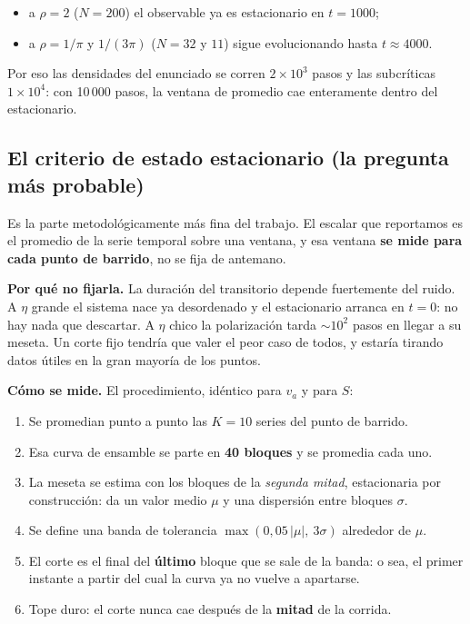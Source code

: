 \documentclass[11pt]{article}
\begin{document}
\begin{itemize}
  \item a $\rho = 2$ ($N = 200$) el observable ya es estacionario en $t = 1000$;
  \item a $\rho = 1/\pi$ y $1/(3\pi)$ ($N = 32$ y $11$) sigue evolucionando
    hasta $t \approx 4000$.
\end{itemize}

Por eso las densidades del enunciado se corren $2\times10^3$ pasos y las
subcríticas $1\times10^4$: con 10\,000 pasos, la ventana de promedio cae
enteramente dentro del estacionario.

\subsection{El criterio de estado estacionario (la pregunta más probable)}

Es la parte metodológicamente más fina del trabajo. El escalar que reportamos es
el promedio de la serie temporal sobre una ventana, y esa ventana \textbf{se
mide para cada punto de barrido}, no se fija de antemano.

\textbf{Por qué no fijarla.} La duración del transitorio depende fuertemente del
ruido. A $\eta$ grande el sistema nace ya desordenado y el estacionario arranca
en $t = 0$: no hay nada que descartar. A $\eta$ chico la polarización tarda
$\sim 10^2$ pasos en llegar a su meseta. Un corte fijo tendría que valer el peor
caso de todos, y estaría tirando datos útiles en la gran mayoría de los puntos.

\textbf{Cómo se mide.} El procedimiento, idéntico para $v_a$ y para $S$:

\begin{enumerate}
  \item Se promedian punto a punto las $K = 10$ series del punto de barrido.
  \item Esa curva de ensamble se parte en \textbf{40 bloques} y se promedia cada
    uno.
  \item La meseta se estima con los bloques de la \emph{segunda mitad},
    estacionaria por construcción: da un valor medio $\mu$ y una dispersión
    entre bloques $\sigma$.
  \item Se define una banda de tolerancia
    $\max(0{,}05\,|\mu|,\ 3\sigma)$ alrededor de $\mu$.
  \item El corte es el final del \textbf{último} bloque que se sale de la banda:
    o sea, el primer instante a partir del cual la curva ya no vuelve a
    apartarse.
  \item Tope duro: el corte nunca cae después de la \textbf{mitad} de la
    corrida.
\end{enumerate}
\end{document}
